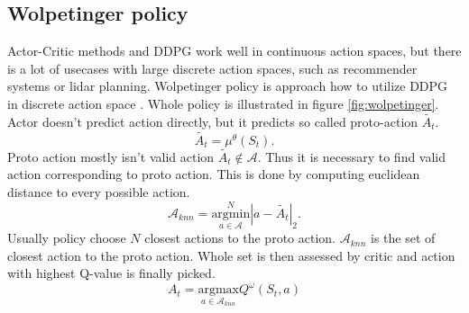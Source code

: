 \subsection{Wolpetinger policy}
Actor-Critic methods and DDPG work well in continuous action spaces, but there is a lot of usecases with large discrete action spaces, such as recommender systems or lidar planning. Wolpetinger policy is approach how to utilize DDPG in discrete action space \cite{dulac2015}. Whole policy is illustrated in figure \ref{fig:wolpetinger}. Actor doesn't predict action directly, but it predicts so called proto-action $\tilde{A_t}$.
\begin{equation}
\tilde{A_t} = \mu^\theta(S_t).
\end{equation}
Proto action mostly isn't valid action $\tilde{A_t} \notin \mathcal{A}$. Thus it is necessary to find valid action corresponding to proto action. This is done by computing euclidean distance to every possible action.
\begin{equation}
\mathcal{A}_{knn} = \overset{N}{\underset{a \in \mathcal{A}}{{\text{argmin}}}} | a - \tilde{A_t} |_2 .
\end{equation}
Usually policy choose $N$ closest actions to the proto action. $\mathcal{A}_{knn}$ is the set of closest action to the proto action. Whole set is then assessed by critic and action with highest Q-value is finally picked.
\begin{equation}
A_t = \underset{a \in \mathcal{A}_{knn}}{\text{argmax}} Q^\omega(S_t, a)
\end{equation}
